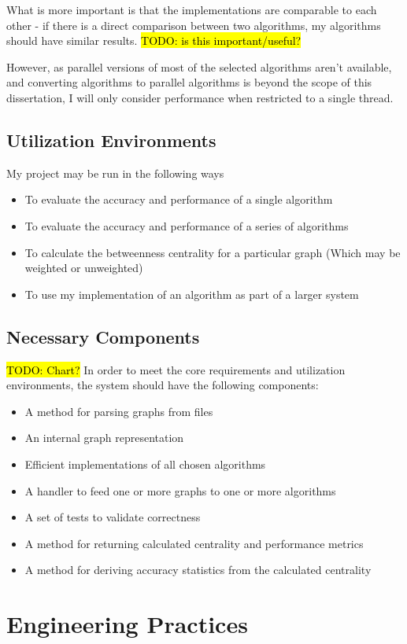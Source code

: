 \documentclass[12pt,a4paper,twoside,openright]{report}
\newcommand{\todo}[1]{\hl{TODO: #1}}
\begin{document}
	What is more important is that the implementations are comparable to each other - if there is a direct comparison between two algorithms, my algorithms should have similar results. \todo{is this important/useful?}
	
	However, as parallel versions of most of the selected algorithms aren't available, and converting algorithms to parallel algorithms is beyond the scope of this dissertation, I will only consider performance when restricted to a single thread.
	\subsection{Utilization Environments}
	My project may be run in the following ways
	\begin{itemize}
		\item To evaluate the accuracy and performance of a single algorithm
		\item To evaluate the accuracy and performance of a series of algorithms
		\item To calculate the betweenness centrality for a particular graph (Which may be weighted or unweighted)
		\item To use my implementation of an algorithm as part of a larger system
	\end{itemize}	
	\subsection{Necessary Components} \todo{Chart?}
	In order to meet the core requirements and utilization environments, the system should have the following components:
	\begin{itemize}
		\item A method for parsing graphs from files
		\item An internal graph representation
		\item Efficient implementations of all chosen algorithms
		\item A handler to feed one or more graphs to one or more algorithms
		\item A set of tests to validate correctness
		\item A method for returning calculated centrality and performance metrics
		\item A method for deriving accuracy statistics from the calculated centrality
	\end{itemize}


\section{Engineering Practices}
\end{document}
